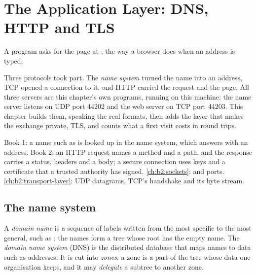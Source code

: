 \chapter{The Application Layer: DNS, HTTP and TLS}\label{ch:b2:application-layer}

A program asks for the page at , the way a browser does when an address is typed:

\label{out:b2:application-layer:hook}

Three protocols took part. The \emph{name system} turned the name into an address, TCP opened a connection to it, and
HTTP carried the request and the page. All three servers are this chapter's own programs, running on this machine:
the name server listens on UDP port 44202 and the web server on TCP port 44203. This chapter builds them,
speaking the real formats, then adds the layer that makes the exchange private, TLS, and counts what a first visit
costs in round trips.

\begin{recall}
Book 1: a name such as  is looked up in the name system, which answers with an
address. Book 2: an HTTP request names a method and a path, and the response carries a status, headers and a body; a
secure connection uses keys and a certificate that a trusted authority has signed. \cref{ch:b2:sockets}:  and
ports. \cref{ch:b2:transport-layer}: UDP datagrams, TCP's handshake and its byte stream.
\end{recall}

\section{The name system}\label{sec:b2:application-layer:dns}

\begin{definition}\label{def:b2:application-layer:dns}
A \emph{domain name} is a sequence of labels written from the most specific to the most general,
such as ; the names form a tree whose root has the empty name. The \emph{domain name system}
(DNS) is the distributed database that maps names to data such as addresses. It is cut into
\emph{zones}: a zone is a part of the tree whose data one organisation keeps, and it may
\emph{delegate} a subtree to another zone.
\end{definition}

